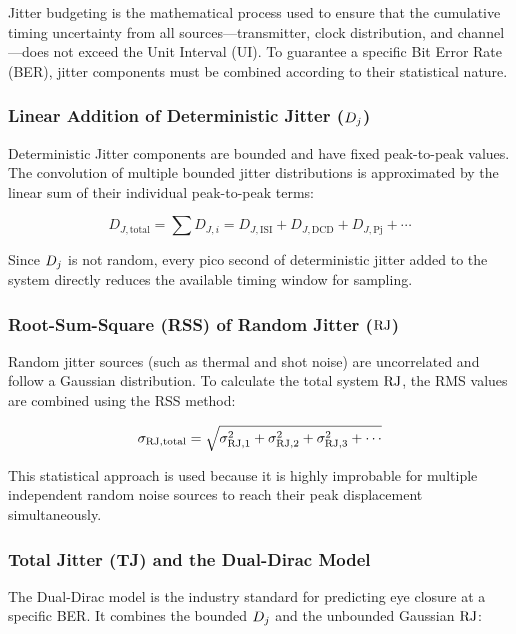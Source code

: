 Jitter budgeting is the mathematical process used to ensure that the cumulative timing uncertainty from all sources—transmitter, clock distribution, and channel—does not exceed the Unit Interval (UI). To guarantee a specific Bit Error Rate (BER), jitter components must be combined according to their statistical nature.

\subsubsection{Linear Addition of Deterministic Jitter (\(D_j\))}
Deterministic Jitter components are bounded and have fixed peak-to-peak values. The convolution of multiple bounded jitter distributions is approximated by the linear sum of their individual peak-to-peak terms:

\begin{equation}
    D_{J,\text{total}} = \sum D_{J,i} = D_{J,\text{ISI}} + D_{J,\text{DCD}} + D_{J,\text{Pj}} + \cdots
\end{equation}

Since \(D_j\) is not random, every pico second of deterministic jitter added to the system directly reduces the available timing window for sampling.

\subsubsection{Root-Sum-Square (RSS) of Random Jitter (\(\mathrm{RJ}\))}
Random jitter sources (such as thermal and shot noise) are uncorrelated and follow a Gaussian distribution. To calculate the total system \(\mathrm{RJ}\), the RMS values are combined using the RSS method:

\begin{equation}
    \sigma_{\mathrm{RJ},\text{total}} = \sqrt{\sigma_{\mathrm{RJ},1}^2 + \sigma_{\mathrm{RJ},2}^2 + \sigma_{\mathrm{RJ},3}^2 + \cdots}
\end{equation}

This statistical approach is used because it is highly improbable for multiple independent random noise sources to reach their peak displacement simultaneously.

\subsubsection{Total Jitter (TJ) and the Dual-Dirac Model}
The Dual-Dirac model is the industry standard for predicting eye closure at a specific BER. It combines the bounded \(D_j\) and the unbounded Gaussian \(\mathrm{RJ}\):

